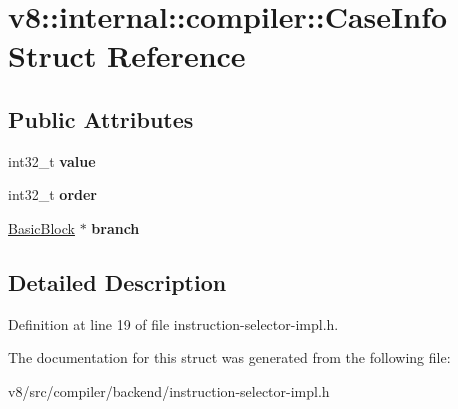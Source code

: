 \hypertarget{structv8_1_1internal_1_1compiler_1_1CaseInfo}{}\section{v8\+:\+:internal\+:\+:compiler\+:\+:Case\+Info Struct Reference}
\label{structv8_1_1internal_1_1compiler_1_1CaseInfo}
\subsection*{Public Attributes}
\begin{DoxyCompactItemize}
\item 
\mbox{\label{structv8_1_1internal_1_1compiler_1_1CaseInfo_a40019fd6d02eeee5baa4b178ea7fbd6b}} 
int32\+\_\+t {\bfseries value}
\item 
\mbox{\label{structv8_1_1internal_1_1compiler_1_1CaseInfo_ae088feeb13bb0e1c1da7e2031c8319c1}} 
int32\+\_\+t {\bfseries order}
\item 
\mbox{\label{structv8_1_1internal_1_1compiler_1_1CaseInfo_ac86ab9c0cecdb255ef453cc5a7aa6187}} 
\mbox{\hyperlink{classv8_1_1internal_1_1compiler_1_1BasicBlock}{Basic\+Block}} $\ast$ {\bfseries branch}
\end{DoxyCompactItemize}


\subsection{Detailed Description}


Definition at line 19 of file instruction-\/selector-\/impl.\+h.



The documentation for this struct was generated from the following file\+:\begin{DoxyCompactItemize}
\item 
v8/src/compiler/backend/instruction-\/selector-\/impl.\+h\end{DoxyCompactItemize}
